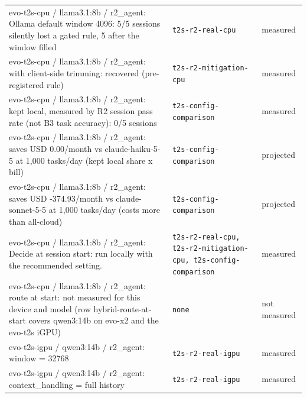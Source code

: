 \begin{longtable}{>{\raggedright\arraybackslash}p{}>{\raggedright\arraybackslash}p{}>{\raggedright\arraybackslash}p{}}
\small evo-t2s-cpu / llama3.1:8b / r2\_agent: Ollama default window 4096: 5/5 sessions silently lost a gated rule, 5 after the window filled & {\footnotesize \texttt{t2s-\allowbreak{}r2-\allowbreak{}real-\allowbreak{}cpu}} & \small measured \\

\small evo-t2s-cpu / llama3.1:8b / r2\_agent: with client-side trimming: recovered (pre-registered rule) & {\footnotesize \texttt{t2s-\allowbreak{}r2-\allowbreak{}mitigation-\allowbreak{}cpu}} & \small measured \\

\small evo-t2s-cpu / llama3.1:8b / r2\_agent: kept local, measured by R2 session pass rate (not B3 task accuracy): 0/5 sessions & {\footnotesize \texttt{t2s-\allowbreak{}config-\allowbreak{}comparison}} & \small measured \\

\small evo-t2s-cpu / llama3.1:8b / r2\_agent: saves USD 0.00/month vs claude-haiku-5-5 at 1,000 tasks/day (kept local share x bill) & {\footnotesize \texttt{t2s-\allowbreak{}config-\allowbreak{}comparison}} & \small projected \\

\small evo-t2s-cpu / llama3.1:8b / r2\_agent: saves USD -374.93/month vs claude-sonnet-5-5 at 1,000 tasks/day (costs more than all-cloud) & {\footnotesize \texttt{t2s-\allowbreak{}config-\allowbreak{}comparison}} & \small projected \\

\small evo-t2s-cpu / llama3.1:8b / r2\_agent: Decide at session start: run locally with the recommended setting. & {\footnotesize \texttt{t2s-\allowbreak{}r2-\allowbreak{}real-\allowbreak{}cpu, t2s-\allowbreak{}r2-\allowbreak{}mitigation-\allowbreak{}cpu, t2s-\allowbreak{}config-\allowbreak{}comparison}} & \small measured \\

\small evo-t2s-cpu / llama3.1:8b / r2\_agent: route at start: not measured for this device and model (row hybrid-route-at-start covers qwen3:14b on evo-x2 and the evo-t2s iGPU) & {\footnotesize \texttt{none}} & \small not measured \\

\small evo-t2s-igpu / qwen3:14b / r2\_agent: window = 32768 & {\footnotesize \texttt{t2s-\allowbreak{}r2-\allowbreak{}real-\allowbreak{}igpu}} & \small measured \\

\small evo-t2s-igpu / qwen3:14b / r2\_agent: context\_handling = full history & {\footnotesize \texttt{t2s-\allowbreak{}r2-\allowbreak{}real-\allowbreak{}igpu}} & \small measured \\


\end{longtable}
